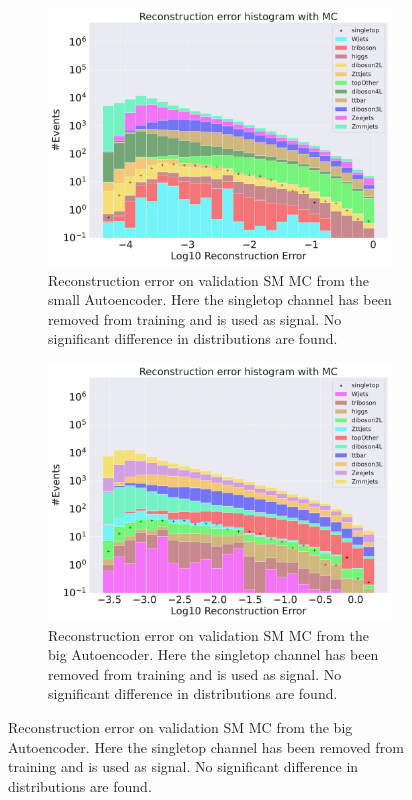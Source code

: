 \begin{figure}[h!]
    \centering
    \begin{subfigure}{.45\textwidth}
        \includegraphics[width=\textwidth]{Figures/AE_testing/small/b_data_recon_big_rm3_feats_sig_singletop.pdf}
        \caption{Reconstruction error on validation SM MC from the small Autoencoder. Here the singletop channel has been removed from training and 
        is used as signal. No significant difference in distributions are found. }
        \label{fig:ae_small_singletop}
    \end{subfigure}
    \hfill
    \begin{subfigure}{.45\textwidth}
        \includegraphics[width=\textwidth]{Figures/AE_testing/big/b_data_recon_big_rm3_feats_sig_singletop.pdf}
        \caption{Reconstruction error on validation SM MC from the big Autoencoder. Here the singletop channel has been removed from training and 
        is used as signal. No significant difference in distributions are found. }
        \label{fig:ae_big_singletop}
    \end{subfigure}
    \hfill 
    \label{fig:ae_big_channel_2}
\end{figure}

